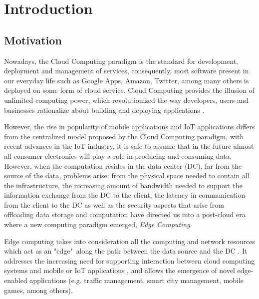 \newcommand{\novathesis}{\emph{novathesis}}
\newcommand{\novathesisclass}{\texttt{novathesis.cls}}

\chapter{Introduction}
\label{cha:introduction}

\section{Motivation}

Nowadays, the Cloud Computing paradigm is the standard for development, deployment and management of services, consequently, most software present in our everyday life such as Google Apps, Amazon, Twitter, among many others is deployed on some form of cloud service. Cloud Computing provides the illusion of unlimited computing power, which revolutionized the way developers, users and businesses rationalize about building and deploying applications \cite{10.1145/1721654.1721672}.

However, the rise in popularity of mobile applications and IoT applications differs from the centralized model proposed by the Cloud Computing paradigm, with recent advances in the IoT industry, it is safe to assume that in the future almost all consumer electronics will play a role in producing and consuming data. However, when the computation resides in the data center (DC), far from the source of the data, problems arise: from the physical space needed to contain all the infrastructure, the increasing amount of bandwidth needed to support the information exchange from the DC to the client, the latency in communication from the client to the DC as well as the security aspects that arise from offloading data storage and computation have directed us into a post-cloud era where a new computing paradigm emerged, \textit{Edge Computing}.

Edge computing takes into consideration all the computing and network resources which act as an "edge"\ along the path between the data source and the DC \cite{Leitao2018}. It addresses the increasing need for supporting interaction between cloud computing systems and mobile or IoT applications \cite{iot_journal_shi_weisong_and_cao}, and allows the emergence of novel edge-enabled applications (e.g. traffic management, smart city management, mobile games, among others).

